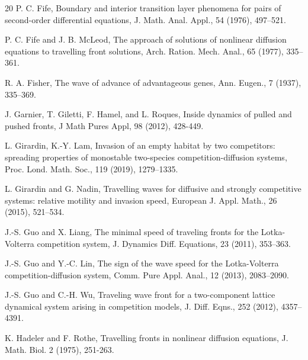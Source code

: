 \documentclass[11pt,a4paper]{article}
\numberwithin{equation}{section}
\numberwithin{figure}{section}
\begin{document}
\begin{thebibliography}{20}
{P. C. Fife}, Boundary and interior transition layer phenomena for pairs of second-order differential equations, J. Math. Anal. Appl., 54 (1976), 497--521.


{P. C. Fife and J. B. McLeod}, The approach of solutions of nonlinear diffusion equations to travelling front solutions,
 Arch. Ration. Mech. Anal., 65 (1977), 335--361.

{R. A. Fisher},
The wave of advance of advantageous genes,
Ann. Eugen., 7 (1937), 335--369.


{J. Garnier, T. Giletti, F. Hamel, and L. Roques}, Inside dynamics of pulled and pushed fronts,
J Math Pures Appl, 98 (2012), 428-449.



{L. Girardin, K.-Y. Lam},
Invasion of an empty habitat by two competitors: spreading properties of monostable
two-species competition-diffusion systems, Proc. Lond. Math. Soc., 119 (2019), 1279--1335.

{L. Girardin and G. Nadin},
Travelling waves for diffusive and strongly competitive systems: relative motility and
invasion speed, European J. Appl. Math., 26 (2015), 521--534.

{J.-S. Guo and X. Liang},
The minimal speed of traveling fronts for the Lotka-Volterra competition system,
J. Dynamics Diff. Equations, 23 (2011), 353--363.

{J.-S. Guo and Y.-C. Lin}, The sign of the wave speed for the Lotka-Volterra competition-diffusion system, Comm. Pure Appl. Anal., 12 (2013), 2083--2090.


{J.-S. Guo and C.-H. Wu},
Traveling wave front for a two-component lattice dynamical system
arising in competition models, J. Diff. Eqns.,  252 (2012), 4357--4391.

{K. Hadeler and F. Rothe},
Travelling fronts in nonlinear diffusion equations, J. Math.
Biol. 2 (1975), 251-263.



\end{thebibliography}
\end{document}
